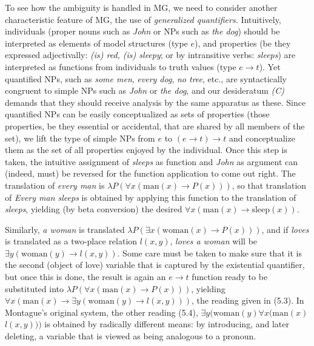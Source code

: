 To see how the ambiguity is handled in MG, we need to consider another
characteristic feature of MG, the use of {\it generalized
  quantifiers.} Intuitively, individuals
(proper nouns such as {\it John} or NPs such as {\it the dog}) should be
interpreted as elements of model structures (type $e$), and properties (be
they expressed adjectivally: {\it (is) red, (is) sleepy}; or by intransitive
verbs: {\it sleeps}) are interpreted as functions from individuals to truth
values (type $e \rightarrow t$). Yet quantified NPs, such as {\it some men},
{\it every dog}, {\it no tree}, etc., are syntactically congruent to simple
NPs such as {\it John} or {\it the dog}, and our desideratum {\sl (C)} demands
that they should receive analysis by the same apparatus as these. Since
quantified NPs can be easily conceptualized as sets of properties (those
properties, be they essential or accidental, that are shared by all members of
the set), we lift the type of simple NPs from $e$ to $(e \rightarrow t)
\rightarrow t$ and conceptualize them as the set of all properties enjoyed by
the individual.  Once this step is taken, the intuitive assignment of {\it
  sleeps} as function and {\it John} as argument can (indeed, must) be
reversed for the function application to come out right. The translation of
{\it every man} is $\lambda P (\forall x (\text{man}(x) \rightarrow P(x)))$, so
that translation of {\it Every man sleeps} is obtained by applying this
function to the translation of {\it sleeps}, yielding (by beta conversion) the
desired $\forall x (\text{man}(x) \rightarrow \text{sleep}(x)).$

Similarly, {\it a woman} is translated $\lambda P (\exists x
(\text{woman}(x) \rightarrow P(x)))$, and if {\it loves} is translated as a
two-place relation $l(x,y)$, {\it loves a woman} will be $\exists y
(\text{woman}(y) \rightarrow l(x,y))$. Some care must be taken to make sure
that it is the second (object of love) variable that is captured by the
existential quantifier, but once this is done, the result is again an $e
\rightarrow t$ function ready to be substituted into $\lambda P (\forall x
(\text{man}(x) \rightarrow P(x)))$, yielding $\forall x (\text{man}(x)
\rightarrow \exists y (\text{woman}(y) \rightarrow l(x,y)))$, the reading
given in (5.3). In Montague's original system, the other reading (5.4),
$\exists y (\text{woman}(y) \forall x (\text{man}(x)$ $l(x,y)))$ is obtained
by radically different means: by introducing, and later deleting, a variable
that is viewed as being analogous to a pronoun. 

